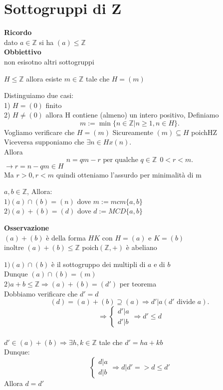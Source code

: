 \documentclass[12px]{article}
\begin{document}
\section{Sottogruppi di \mathbb Z}
\textbf{Ricordo}\\
dato $a\in \mathbb Z$ si ha  $(a)\leq \mathbb Z$\\
 \textbf{Obbiettivo}\\
 non esisotno altri sottogruppi
 \begin{teo}
 	$H\leq \mathbb Z$ allora esiste $m\in \mathbb Z$ tale che  $H = (m)$
 \end{teo}
 \begin{dimo}
 	Distinguiamo due casi:\\
	1) $H= (0)$ finito\\
	2) $H\neq(0)$ allora H contiene (almeno) un intero positivo, Definiamo
	\[
		m := \min\lbrace n\in\mathbb Z | n\geq 1, n\in H\rbrace
	.\] 
	Vogliamo verificare che $H = (m)$ Sicureamente $(m)\subseteq H$ poich\e H\leq \mathbb Z\\
	Viceversa supponiamo che  $\exists n\in Hx(n)$.\\
	Allora
	 \[
		 n = qm - r \text{ per qualche } q\in \mathbb Z \ \ 0 < r < m
	.\] 
	$ \rightarrow r = n - qm \in H$\\
	Ma $r>0, r<m$ quindi otteniamo l'assurdo per minimalità di m

 \end{dimo}
 \begin{prop}
 	$a,b\in \mathbb Z$, Allora:\\
	$1) (a)\cap (b) = (n)$ dove $m := mcm\lbrace a,b\rbrace$\\
	$2) (a) + (b) = (d)$ dove  $d := MCD\lbrace a, b \rbrace$

 \end{prop}
 \textbf{Osservazione}\\ 
 $(a)+(b)$ è della forma $HK$ con $ H = (a)$ e $K = (b)$\\
 inoltre $(a) + (b)\leq \mathbb Z$ poich\e $(\mathbb Z, +)$ è abeliano
 \begin{dimo}
	 $1)(a)\cap (b)$ è il sottogruppo dei multipli di $a$ e di $b$\\
	 Dunque $(a)\cap(b) = (m)$ \\
	 $2)a+b\leq \mathbb Z \Rightarrow (a) + (b) = (d')$ per teorema\\
	 Dobbiamo verificare che $d' = d$ \\
	 \[
		 (d) = (a)+(b)\supseteq (a) \Rightarrow d'|a ( d'\text{ divide }a)
	 .\] 
	 \[ \Rightarrow  \begin{cases}
	 	d'|a\\
		d'|b
	\end{cases} \Rightarrow d'\leq d\]\\
	 $d'\in (a) + (b) \Rightarrow \exists h,k\in \mathbb Z$ tale che $d' = ha + kb$\\
	 Dunque:\\
	 \[
	  \begin{cases}
	  	d|a\\
		d|b
	  \end{cases} \Rightarrow d|d' => d \leq d'\]
	  Allora $d=d'$
 \end{dimo}
\end{document}
